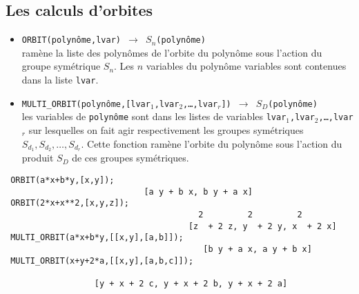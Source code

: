 \documentclass[11pt]{article}
\begin{document}
\subsection{Les calculs d'orbites}
\begin{itemize}
\item {\tt ORBIT(polyn\^ome,lvar) 
$\longrightarrow$ $S_n$(polyn\^ome) \\}
ram\`ene  la liste des polyn\^omes de l'orbite du polyn\^ome
sous l'action
du groupe sym\'etrique $S_n$. Les $n$ variables du polyn\^ome
variables sont contenues dans la liste {\tt lvar}.
\item {\tt MULTI\_ORBIT(polyn\^ome,[lvar$_{1}$,lvar$_{2}$,\ldots ,lvar$_{r}$])
$\longrightarrow$ ${S_D}$(polyn\^ome) }\\
les variables de {\tt polyn\^ome} sont dans les listes de variables
{\tt lvar$_1$,lvar$_{2}$,\ldots ,lvar$_{r}$} sur
lesquelles on fait agir respectivement les groupes sym\'etriques
$S_{d_1},S_{d_2},\ldots ,S_{d_r}$. Cette fonction
ram\`ene l'orbite du polyn\^ome sous l'action du produit
$S_D$ de ces groupes sym\'etriques.
\end{itemize}
\small
\begin{verbatim}
 ORBIT(a*x+b*y,[x,y]);
                            [a y + b x, b y + a x]
 ORBIT(2*x+x**2,[x,y,z]);
                                       2         2         2
                                     [z  + 2 z, y  + 2 y, x  + 2 x]
 MULTI_ORBIT(a*x+b*y,[[x,y],[a,b]]);
                                        [b y + a x, a y + b x]
 MULTI_ORBIT(x+y+2*a,[[x,y],[a,b,c]]);
 
                  [y + x + 2 c, y + x + 2 b, y + x + 2 a]
\end{verbatim}
\normalsize
\end{document}

